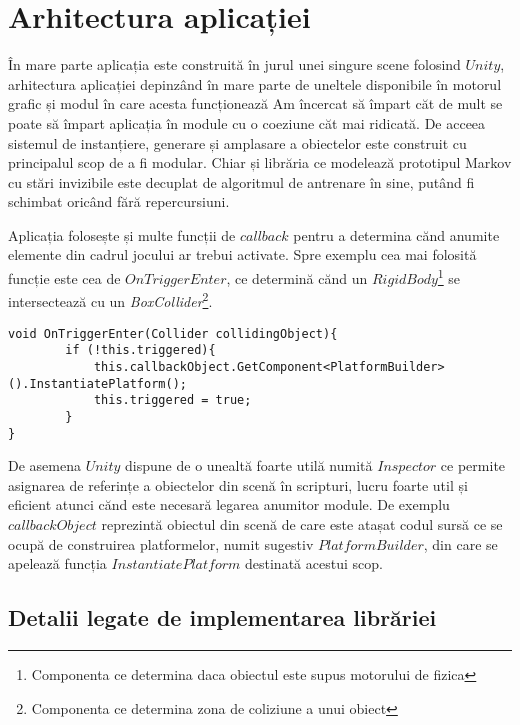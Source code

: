 \chapter{Arhitectura aplicației}

În mare parte aplicația este construită în jurul unei singure scene folosind $Unity$, arhitectura aplicației depinzând în mare parte de uneltele disponibile în motorul grafic și modul în care acesta funcționează Am încercat să împart căt de mult se poate să împart aplicația în module cu o coeziune căt mai ridicată. De acceea sistemul de instanțiere, generare și amplasare a obiectelor este construit cu principalul scop de a fi modular. Chiar și librăria ce modelează prototipul Markov cu stări invizibile este decuplat de algoritmul de antrenare în sine, putând fi schimbat oricând fără repercursiuni.\par

Aplicația folosește și multe funcții de $callback$ pentru a determina cănd anumite elemente din cadrul jocului ar trebui activate. Spre exemplu cea mai folosită funcție este cea de $OnTriggerEnter$, ce determină cănd un $RigidBody$\footnote{Componenta ce determina daca obiectul este supus motorului de fizica} se intersectează cu un \textit{Box}\textit{Collider}\footnote{Componenta ce determina zona de coliziune a unui obiect}.\par

\begin{lstlisting}[caption=Exemplu de utilizare a functiei OnTriggerEnter]
void OnTriggerEnter(Collider collidingObject){
        if (!this.triggered){
            this.callbackObject.GetComponent<PlatformBuilder>().InstantiatePlatform();
            this.triggered = true;
        }
}
\end{lstlisting}
\par

De asemena $Unity$ dispune de o unealtă foarte utilă numită $Inspector$ ce permite asignarea de referințe a obiectelor din scenă în scripturi, lucru foarte util și eficient atunci cănd este necesară legarea anumitor module. De exemplu $callbackObject$ reprezintă obiectul din scenă de care este atașat codul sursă ce se ocupă de construirea platformelor, numit sugestiv $PlatformBuilder$, din care se apelează funcția $InstantiatePlatform$ destinată acestui scop.\par

\section{Detalii legate de implementarea librăriei}

